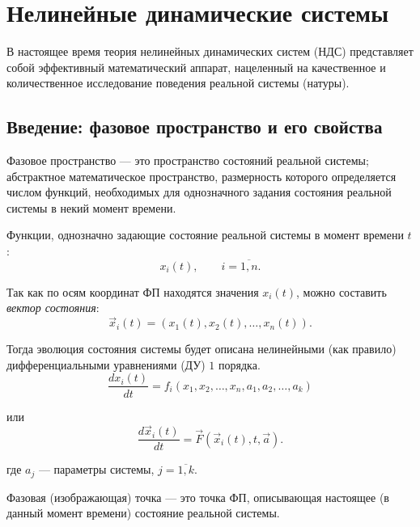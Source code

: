 \chapter{Нелинейные динамические системы}
В настоящее время теория нелинейных динамических систем (НДС) представляет собой эффективный математический аппарат, нацеленный на качественное и количественное исследование поведения реальной системы (натуры).
 
\section{Введение: фазовое пространство и его свойства}
\begin{definition}
  Фазовое пространство --- это пространство состояний реальной системы; абстрактное математическое пространство, размерность которого определяется числом функций, необходимых для однозначного задания состояния реальной системы в некий момент времени.
\end{definition}

Функции, однозначно задающие состояние реальной системы в момент времени $t$:
\begin{equation*}
	x_i(t), \qquad i = \overline{1,n}.
\end{equation*}

Так как по осям координат ФП находятся значения $x_i(t)$, можно составить \textit{вектор состояния}:
\begin{equation*}
	\vec{x}_i(t) = (x_1(t), x_2(t), \ldots, x_n(t)).
\end{equation*}

Тогда эволюция состояния системы будет описана нелинейными (как правило) дифференциальными уравнениями (ДУ) $1$ порядка.
\begin{equation} \label{eq:evol_system_state}
	\frac{dx_i(t)}{dt} = f_i(x_1, x_2, \ldots, x_n, a_1, a_2, \ldots, a_k)
\end{equation}

или
\begin{equation*}
	\frac{d\vec{x}_i(t)}{dt} = \vec{F}(\vec{x}_i(t), t, \vec{a}).
\end{equation*}

где $a_j$ --- параметры системы, $j = \overline{1,k}$.

\begin{definition}
	Фазовая (изображающая) точка --- это точка ФП, описывающая настоящее (в данный момент времени) состояние реальной системы.
\end{definition}

